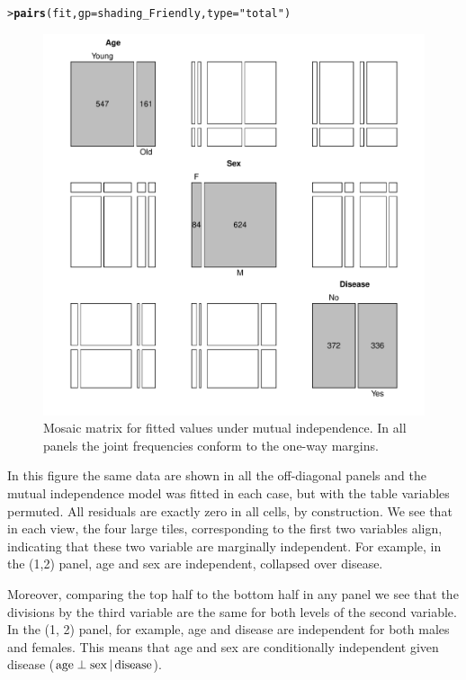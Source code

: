 \documentclass[10pt,krantz2]{krantz}\usepackage[]{graphicx}\usepackage[]{color}
\makeatletter
\newcommand{\hlstr}[1]{\textcolor[rgb]{0.192,0.494,0.8}{#1}}%
\newcommand{\hlstd}[1]{\textcolor[rgb]{0.345,0.345,0.345}{#1}}%
\newcommand{\hlkwc}[1]{\textcolor[rgb]{0.333,0.667,0.333}{#1}}%
\newcommand{\hlkwd}[1]{\textcolor[rgb]{0.737,0.353,0.396}{\textbf{#1}}}%
\newenvironment{kframe}{%
 \def\at@end@of@kframe{}%
 \ifinner\ifhmode%
  \def\at@end@of@kframe{\end{minipage}}%
  \begin{minipage}{\columnwidth}%
 \fi\fi%
 \def\FrameCommand##1{\hskip\@totalleftmargin \hskip-\fboxsep
 \colorbox{shadecolor}{##1}\hskip-\fboxsep
     \hskip-\linewidth \hskip-\@totalleftmargin \hskip\columnwidth}%
 \MakeFramed {\advance\hsize-\width
   \@totalleftmargin\z@ \linewidth\hsize
   \@setminipage}}%
 {\par\unskip\endMakeFramed%
 \at@end@of@kframe}
\newenvironment{knitrout}{}{} %
\renewenvironment{knitrout}{\small\renewcommand{\baselinestretch}{.85}}{} %
\makeatother
\begin{document}
\begin{knitrout}
\color{fgcolor}\begin{kframe}
\begin{alltt}
\hlstd{> }\hlkwd{pairs}\hlstd{(fit,} \hlkwc{gp} \hlstd{= shading_Friendly,} \hlkwc{type} \hlstd{=} \hlstr{"total"}\hlstd{)}
\end{alltt}
\end{kframe}\begin{figure}[!htb]

\centerline{\includegraphics[width=.8\textwidth]{ch05/fig/struc-mos3-1} }

\caption[Mosaic matrix for fitted values under mutual independence]{Mosaic matrix for fitted values under mutual independence.  In all panels the joint frequencies conform to the one-way margins.}\label{fig:struc-mos3}
\end{figure}


\end{knitrout}
In this figure the same data are shown in all the off-diagonal panels
and the mutual independence model was fitted in each case, but with the
table variables permuted.  All residuals are exactly zero in all cells,
by construction.
We see that in each view, the four large
tiles, corresponding to the first two variables align, indicating
that these two variable are marginally independent.
For example, in the (1,2) panel, age and sex are independent, collapsed
over disease.

Moreover, comparing the top half to the bottom half
in any panel we see that the divisions by the third variable
are the same for both levels of the second variable.
In the (1, 2) panel, for example, age and disease are independent
for both males and females.
This means that age and sex are conditionally independent
given disease ($\mathrm{age} \perp \mathrm{sex} \, | \, \mathrm{disease}$).
\end{document}
